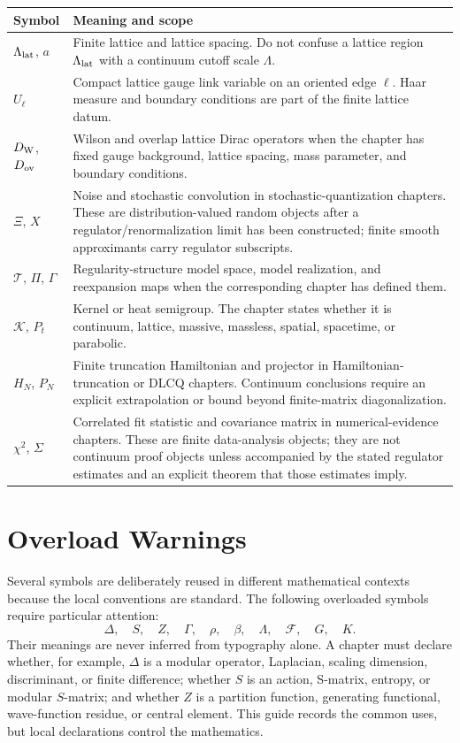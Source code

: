 \begin{longtable}{>{\raggedright\arraybackslash}p{}
                  >{\raggedright\arraybackslash}p{}}
\hline
\textbf{Symbol} & \textbf{Meaning and scope}\\
\hline
\endhead
\(\Lambda_{\rm lat}\), \(a\) &
Finite lattice and lattice spacing.  Do not confuse a lattice region
\(\Lambda_{\rm lat}\) with a continuum cutoff scale \(\Lambda\).\\
\(U_\ell\) &
Compact lattice gauge link variable on an oriented edge \(\ell\).  Haar
measure and boundary conditions are part of the finite lattice datum.\\
\(D_{\rm W}\), \(D_{\rm ov}\) &
Wilson and overlap lattice Dirac operators when the chapter has fixed gauge
background, lattice spacing, mass parameter, and boundary conditions.\\
\(\Xi\), \(X\) &
Noise and stochastic convolution in stochastic-quantization chapters.  These
are distribution-valued random objects after a regulator/renormalization
limit has been constructed; finite smooth approximants carry regulator
subscripts.\\
\(\mathcal T\), \(\Pi\), \(\Gamma\) &
Regularity-structure model space, model realization, and reexpansion maps
when the corresponding chapter has defined them.\\
\(\mathcal K\), \(P_t\) &
Kernel or heat semigroup.  The chapter states whether it is continuum,
lattice, massive, massless, spatial, spacetime, or parabolic.\\
\(H_N\), \(P_N\) &
Finite truncation Hamiltonian and projector in Hamiltonian-truncation or
DLCQ chapters.  Continuum conclusions require an explicit extrapolation or
bound beyond finite-matrix diagonalization.\\
\(\chi^2\), \(\Sigma\) &
Correlated fit statistic and covariance matrix in numerical-evidence
chapters.  These are finite data-analysis objects; they are not continuum
proof objects unless accompanied by the stated regulator estimates and an
explicit theorem that those estimates imply.\\
\hline
\end{longtable}

\section*{Overload Warnings}

Several symbols are deliberately reused in different mathematical contexts
because the local conventions are standard.  The following overloaded
symbols require particular attention:
\[
  \Delta,\quad S,\quad Z,\quad \Gamma,\quad \rho,\quad \beta,\quad
  \Lambda,\quad \mathcal F,\quad G,\quad K .
\]
Their meanings are never inferred from typography alone.  A chapter must
declare whether, for example, \(\Delta\) is a modular operator, Laplacian,
scaling dimension, discriminant, or finite difference; whether \(S\) is an
action, S-matrix, entropy, or modular \(S\)-matrix; and whether \(Z\) is a
partition function, generating functional, wave-function residue, or central
element.  This guide records the common uses, but local declarations control
the mathematics.
